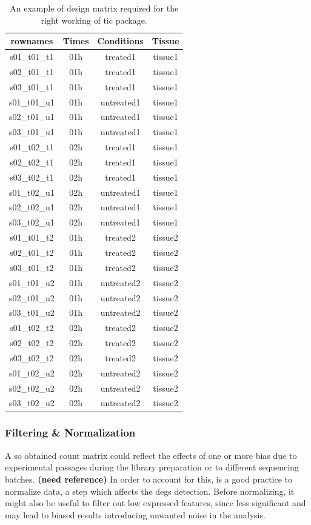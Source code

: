 \begin{table}[H]
\centering
\begin{tabular}{cccc}
\hline\hline
rownames & Times & Conditions & Tissue \\
\hline
s01\_t01\_t1 & 01h & treated1 & tissue1 \\
s02\_t01\_t1 & 01h & treated1 & tissue1 \\
s03\_t01\_t1 & 01h & treated1 & tissue1 \\
s01\_t01\_u1 & 01h & untreated1 & tissue1 \\
s02\_t01\_u1 & 01h & untreated1 & tissue1 \\
s03\_t01\_u1 & 01h & untreated1 & tissue1 \\
s01\_t02\_t1 & 02h & treated1 & tissue1 \\
s02\_t02\_t1 & 02h & treated1 & tissue1 \\
s03\_t02\_t1 & 02h & treated1 & tissue1 \\
s01\_t02\_u1 & 02h & untreated1 & tissue1 \\
s02\_t02\_u1 & 02h & untreated1 & tissue1 \\
s03\_t02\_u1 & 02h & untreated1 & tissue1 \\
s01\_t01\_t2 & 01h & treated2 & tissue2 \\
s02\_t01\_t2 & 01h & treated2 & tissue2 \\
s03\_t01\_t2 & 01h & treated2 & tissue2 \\
s01\_t01\_u2 & 01h & untreated2 & tissue2 \\
s02\_t01\_u2 & 01h & untreated2 & tissue2 \\
s03\_t01\_u2 & 01h & untreated2 & tissue2 \\
s01\_t02\_t2 & 02h & treated2 & tissue2 \\
s02\_t02\_t2 & 02h & treated2 & tissue2 \\
s03\_t02\_t2 & 02h & treated2 & tissue2 \\
s01\_t02\_u2 & 02h & untreated2 & tissue2 \\
s02\_t02\_u2 & 02h & untreated2 & tissue2 \\
s03\_t02\_u2 & 02h & untreated2 & tissue2 \\
\hline
\end{tabular}
\caption[\gls{tic} Design Matrix example]{An example of design matrix required for the right working of \gls{tic} package.}
\label{tab:ticorserdesmat}
\end{table}

\subsubsection{Filtering \& Normalization}
A so obtained count matrix could reflect the effects of one or more bias due to experimental passages during the library preparation or to different sequencing batches. \textbf{(need reference)}
In order to account for this, is a good practice to normalize data, a step which affects the \glspl{deg} detection\cite{Peixoto2015, Soneson2013d, Bullard2010}.
Before normalizing, it might also be useful to filter out low expressed features, since less significant and may lead to biased results introducing unwanted noise in the analysis. 

